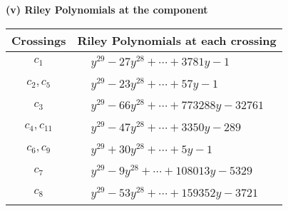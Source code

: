 \documentclass[1p]{elsarticle_modified}
\theoremstyle{definition}
\begin{document}
\newpage\renewcommand{\arraystretch}{1}
\flushleft \textbf{(v) Riley Polynomials at the component}\newline \\
\begin{tabular}{m{50pt}|m{274pt}}
Crossings & \hspace{64pt}Riley Polynomials at each crossing \\
\hline $$\begin{aligned}c_{1}\end{aligned}$$&$\begin{aligned}
&y^{29}-27 y^{28}+\cdots+3781 y-1
\end{aligned}$\\
\hline $$\begin{aligned}c_{2},c_{5}\end{aligned}$$&$\begin{aligned}
&y^{29}-23 y^{28}+\cdots+57 y-1
\end{aligned}$\\
\hline $$\begin{aligned}c_{3}\end{aligned}$$&$\begin{aligned}
&y^{29}-66 y^{28}+\cdots+773288 y-32761
\end{aligned}$\\
\hline $$\begin{aligned}c_{4},c_{11}\end{aligned}$$&$\begin{aligned}
&y^{29}-47 y^{28}+\cdots+3350 y-289
\end{aligned}$\\
\hline $$\begin{aligned}c_{6},c_{9}\end{aligned}$$&$\begin{aligned}
&y^{29}+30 y^{28}+\cdots+5 y-1
\end{aligned}$\\
\hline $$\begin{aligned}c_{7}\end{aligned}$$&$\begin{aligned}
&y^{29}-9 y^{28}+\cdots+108013 y-5329
\end{aligned}$\\
\hline $$\begin{aligned}c_{8}\end{aligned}$$&$\begin{aligned}
&y^{29}-53 y^{28}+\cdots+159352 y-3721
\end{aligned}$\\

\end{tabular}
\end{document}
